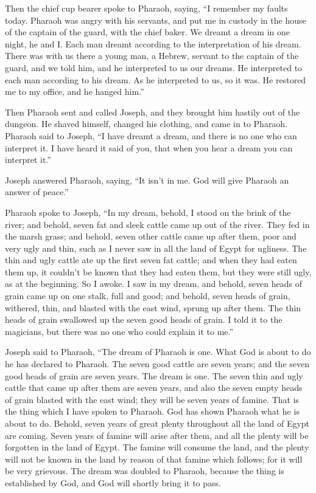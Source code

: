  Then the chief cup bearer spoke to Pharaoh, saying, ``I
remember my faults today.  Pharaoh was angry with his
servants, and put me in custody in the house of the captain of the
guard, with the chief baker.  We dreamt a dream in one
night, he and I. Each man dreamt according to the interpretation of his
dream.  There was with us there a young man, a Hebrew,
servant to the captain of the guard, and we told him, and he interpreted
to us our dreams. He interpreted to each man according to his dream.
 As he interpreted to us, so it was. He restored me to my
office, and he hanged him.''

 Then Pharaoh sent and called Joseph, and they brought him
hastily out of the dungeon. He shaved himself, changed his clothing, and
came in to Pharaoh.  Pharaoh said to Joseph, ``I have
dreamt a dream, and there is no one who can interpret it. I have heard
it said of you, that when you hear a dream you can interpret it.''

 Joseph answered Pharaoh, saying, ``It isn't in me. God
will give Pharaoh an answer of peace.''

 Pharaoh spoke to Joseph, ``In my dream, behold, I stood on
the brink of the river;  and behold, seven fat and sleek
cattle came up out of the river. They fed in the marsh grass;
 and behold, seven other cattle came up after them, poor
and very ugly and thin, such as I never saw in all the land of Egypt for
ugliness.  The thin and ugly cattle ate up the first seven
fat cattle;  and when they had eaten them up, it couldn't
be known that they had eaten them, but they were still ugly, as at the
beginning. So I awoke.  I saw in my dream, and behold,
seven heads of grain came up on one stalk, full and good; 
and behold, seven heads of grain, withered, thin, and blasted with the
east wind, sprung up after them.  The thin heads of grain
swallowed up the seven good heads of grain. I told it to the magicians,
but there was no one who could explain it to me.''

 Joseph said to Pharaoh, ``The dream of Pharaoh is one.
What God is about to do he has declared to Pharaoh.  The
seven good cattle are seven years; and the seven good heads of grain are
seven years. The dream is one.  The seven thin and ugly
cattle that came up after them are seven years, and also the seven empty
heads of grain blasted with the east wind; they will be seven years of
famine.  That is the thing which I have spoken to Pharaoh.
God has shown Pharaoh what he is about to do.  Behold,
seven years of great plenty throughout all the land of Egypt are coming.
 Seven years of famine will arise after them, and all the
plenty will be forgotten in the land of Egypt. The famine will consume
the land,  and the plenty will not be known in the land by
reason of that famine which follows; for it will be very grievous.
 The dream was doubled to Pharaoh, because the thing is
established by God, and God will shortly bring it to pass.

